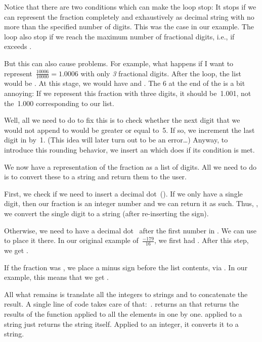 Notice that there are two conditions which can make the loop stop:
It stops if we can represent the fraction completely and exhaustively as decimal string with no more than the specified number  of digits.
This was the case in our example.
The loop also stop if we reach the maximum number of fractional digits, i.e., if  exceeds .

But this can also cause problems.
For example, what happens if I want to represent~$\frac{10006}{10000}=1.0006$ with only \emph{3} fractional digits.
After the loop, the list  would be \pythonil{[1, 0, 0, 0]}.
At this stage, we would have  and .
The 6 at the end of the  is a bit annoying:
If we represent this fraction with three digits, it should be~1.001, not the~1.000 corresponding to our  list.

Well, all we need to do to fix this is to check whether the next digit that we would not append to  would be greater or equal to~5.
If so, we increment the last digit in  by~1.
(This idea will later turn out to be an error\dots)
Anyway, to introduce this rounding behavior, we insert an  which does  if its condition is met.

We now have a representation of the fraction as a list of digits.
All we need to do is to convert these to a string and return them to the user.

First, we check if we need to insert a decimal dot~().
If we only have a single digit, then our fraction is an integer number and we can return it as such.
Thus, , we convert the single digit to a string (after re-inserting the sign).

Otherwise, we need to have a decimal dot~ after the first number in .
We can use  to place it there.
In our original example of~$\frac{-179}{16}$, we first had .
After this step, we get .

If the fraction was , we place a minus sign before the list contents, via .
In our example, this means that we get .

All what remains is translate all the integers to strings and to concatenate the result.
A single line of code takes care of that:~.
 returns an  that returns the results of the  function applied to all the elements in  one by one.
 applied to a string just returns the string itself.
Applied to an integer, it converts it to a string.

